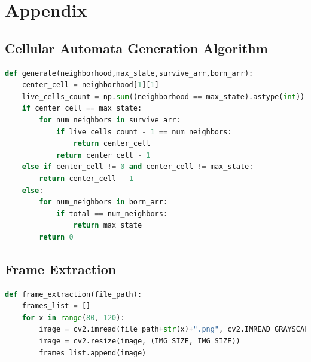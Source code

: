 \documentclass[12pt]{article}
\numberwithin{figure}{section} %
\begin{document}
\newpage
\section{Appendix}
\subsection{Cellular Automata Generation Algorithm}
\begin{lstlisting}[language=Python]
def generate(neighborhood,max_state,survive_arr,born_arr):
    center_cell = neighborhood[1][1]
    live_cells_count = np.sum((neighborhood == max_state).astype(int))
    if center_cell == max_state: 
        for num_neighbors in survive_arr:
            if live_cells_count - 1 == num_neighbors: 
                return center_cell 
            return center_cell - 1
    else if center_cell != 0 and center_cell != max_state:
        return center_cell - 1
    else:
        for num_neighbors in born_arr: 
            if total == num_neighbors:
                return max_state 
        return 0
\end{lstlisting}

\subsection{Frame Extraction}
\begin{lstlisting}[language = Python]
def frame_extraction(file_path):
    frames_list = []
    for x in range(80, 120):
        image = cv2.imread(file_path+str(x)+".png", cv2.IMREAD_GRAYSCALE)
        image = cv2.resize(image, (IMG_SIZE, IMG_SIZE))
        frames_list.append(image)
\end{lstlisting}
\end{document}
